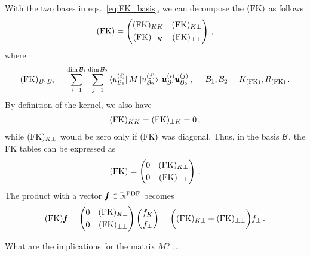 With the two bases in eqs.~\eqref{eq:FK_basis}, we can decompose the $(\mathrm{FK})$ as follows
\begin{equation}
  (\mathrm{FK}) =
  \begin{pmatrix}
    (\mathrm{FK})_{KK}     & (\mathrm{FK})_{K\bot} \\[3pt]
    (\mathrm{FK})_{\bot K} & (\mathrm{FK})_{\bot\bot}
  \end{pmatrix} \,,
\end{equation}
where
\begin{align}
  (\mathrm{FK})_{B_1 B_2} = \sum_{i=1}^{\dim\mathcal{B}_1} \sum_{j=1}^{\dim\mathcal{B}_2}
  \bra{u_{\mathcal{B}_1}^{(i)}} M \ket{u_{\mathcal{B}_2}^{(j)}} \;
  \pmb{u}_{\mathcal{B}_1}^{(i)} \pmb{u}_{\mathcal{B}_2}^{(j)}\,,
  \hspace{5mm}
  \mathcal{B}_1, \mathcal{B}_2 = K_{(\mathrm{FK})}, R_{(\mathrm{FK})}\,.
\end{align}
By definition of the kernel, we also have
\begin{align}
  (\mathrm{FK})_{KK} = (\mathrm{FK})_{\bot K} = 0 \,,
\end{align}
while $(\mathrm{FK})_{K\bot}$ would be zero only if $(\mathrm{FK})$ was diagonal. Thus, in the basis
$\mathcal{B}$, the FK tables can be expressed as
\begin{align}
  (\mathrm{FK}) =
  \begin{pmatrix}
    0  & (\mathrm{FK})_{K\bot} \\[3pt]
    0 & (\mathrm{FK})_{\bot\bot}
  \end{pmatrix} \,.
\end{align}
The product with a vector $\pmb{f} \in \mathbb{R}^{\textrm{PDF}}$ becomes
\begin{equation}
  (\mathrm{FK}) \pmb{f} =
    \begin{pmatrix}
      0  & (\mathrm{FK})_{K\bot} \\[3pt]
      0  & (\mathrm{FK})_{\bot\bot}
    \end{pmatrix}
    \begin{pmatrix} 
      f_K \\[2pt]
      f_{\bot}
    \end{pmatrix}
    = \biggl((\mathrm{FK})_{K\bot} + (\mathrm{FK})_{\bot\bot}\biggr) f_{\bot} \,.
\end{equation}

What are the implications for the matrix $M$? ...
